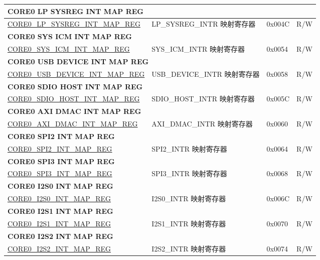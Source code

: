 \begin{longtable}{ | p{8.7cm} | p{6.2cm} | p{1.3cm} | p{1cm} | }
\multicolumn{4}{|l|}{\textbf{CORE0 LP SYSREG INT MAP REG}} \\ \hline
\hyperref[regdesc:CORE0LPSYSREGINTMAPREG]{CORE0\_LP\_SYSREG\_INT\_MAP\_REG} & LP\_SYSREG\_INTR 映射寄存器 & 0x004C & R/W \\ \hline
\multicolumn{4}{|l|}{\textbf{CORE0 SYS ICM INT MAP REG}} \\ \hline
\hyperref[regdesc:CORE0SYSICMINTMAPREG]{CORE0\_SYS\_ICM\_INT\_MAP\_REG} & SYS\_ICM\_INTR 映射寄存器 & 0x0054 & R/W \\ \hline
\multicolumn{4}{|l|}{\textbf{CORE0 USB DEVICE INT MAP REG}} \\ \hline
\hyperref[regdesc:CORE0USBDEVICEINTMAPREG]{CORE0\_USB\_DEVICE\_INT\_MAP\_REG} & USB\_DEVICE\_INTR 映射寄存器 & 0x0058 & R/W \\ \hline
\multicolumn{4}{|l|}{\textbf{CORE0 SDIO HOST INT MAP REG}} \\ \hline
\hyperref[regdesc:CORE0SDIOHOSTINTMAPREG]{CORE0\_SDIO\_HOST\_INT\_MAP\_REG} & SDIO\_HOST\_INTR 映射寄存器 & 0x005C & R/W \\ \hline
\multicolumn{4}{|l|}{\textbf{CORE0 AXI DMAC INT MAP REG}} \\ \hline
\hyperref[regdesc:CORE0AXIDMACINTMAPREG]{CORE0\_AXI\_DMAC\_INT\_MAP\_REG} & AXI\_DMAC\_INTR 映射寄存器 & 0x0060 & R/W \\ \hline
\multicolumn{4}{|l|}{\textbf{CORE0 SPI2 INT MAP REG}} \\ \hline
\hyperref[regdesc:CORE0SPI2INTMAPREG]{CORE0\_SPI2\_INT\_MAP\_REG} & SPI2\_INTR 映射寄存器 & 0x0064 & R/W \\ \hline
\multicolumn{4}{|l|}{\textbf{CORE0 SPI3 INT MAP REG}} \\ \hline
\hyperref[regdesc:CORE0SPI3INTMAPREG]{CORE0\_SPI3\_INT\_MAP\_REG} & SPI3\_INTR 映射寄存器 & 0x0068 & R/W \\ \hline
\multicolumn{4}{|l|}{\textbf{CORE0 I2S0 INT MAP REG}} \\ \hline
\hyperref[regdesc:CORE0I2S0INTMAPREG]{CORE0\_I2S0\_INT\_MAP\_REG} & I2S0\_INTR 映射寄存器 & 0x006C & R/W \\ \hline
\multicolumn{4}{|l|}{\textbf{CORE0 I2S1 INT MAP REG}} \\ \hline
\hyperref[regdesc:CORE0I2S1INTMAPREG]{CORE0\_I2S1\_INT\_MAP\_REG} & I2S1\_INTR 映射寄存器 & 0x0070 & R/W \\ \hline
\multicolumn{4}{|l|}{\textbf{CORE0 I2S2 INT MAP REG}} \\ \hline
\hyperref[regdesc:CORE0I2S2INTMAPREG]{CORE0\_I2S2\_INT\_MAP\_REG} & I2S2\_INTR 映射寄存器 & 0x0074 & R/W \\ \hline

\end{longtable}
